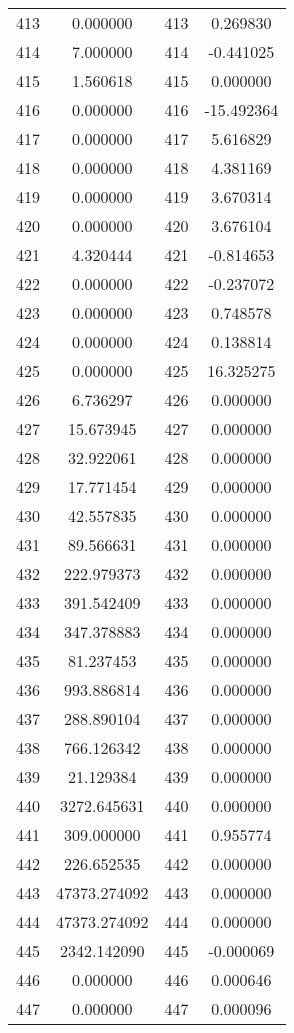 \documentclass[12pt]{article}
\begin{document}
\begin{longtable}{@{}cccc@{}}
413 & 0.000000 & 413 & 0.269830 \\
414 & 7.000000 & 414 & -0.441025 \\
415 & 1.560618 & 415 & 0.000000 \\
416 & 0.000000 & 416 & -15.492364 \\
417 & 0.000000 & 417 & 5.616829 \\
418 & 0.000000 & 418 & 4.381169 \\
419 & 0.000000 & 419 & 3.670314 \\
420 & 0.000000 & 420 & 3.676104 \\
421 & 4.320444 & 421 & -0.814653 \\
422 & 0.000000 & 422 & -0.237072 \\
423 & 0.000000 & 423 & 0.748578 \\
424 & 0.000000 & 424 & 0.138814 \\
425 & 0.000000 & 425 & 16.325275 \\
426 & 6.736297 & 426 & 0.000000 \\
427 & 15.673945 & 427 & 0.000000 \\
428 & 32.922061 & 428 & 0.000000 \\
429 & 17.771454 & 429 & 0.000000 \\
430 & 42.557835 & 430 & 0.000000 \\
431 & 89.566631 & 431 & 0.000000 \\
432 & 222.979373 & 432 & 0.000000 \\
433 & 391.542409 & 433 & 0.000000 \\
434 & 347.378883 & 434 & 0.000000 \\
435 & 81.237453 & 435 & 0.000000 \\
436 & 993.886814 & 436 & 0.000000 \\
437 & 288.890104 & 437 & 0.000000 \\
438 & 766.126342 & 438 & 0.000000 \\
439 & 21.129384 & 439 & 0.000000 \\
440 & 3272.645631 & 440 & 0.000000 \\
441 & 309.000000 & 441 & 0.955774 \\
442 & 226.652535 & 442 & 0.000000 \\
443 & 47373.274092 & 443 & 0.000000 \\
444 & 47373.274092 & 444 & 0.000000 \\
445 & 2342.142090 & 445 & -0.000069 \\
446 & 0.000000 & 446 & 0.000646 \\
447 & 0.000000 & 447 & 0.000096 \\

\end{longtable}
\end{document}
